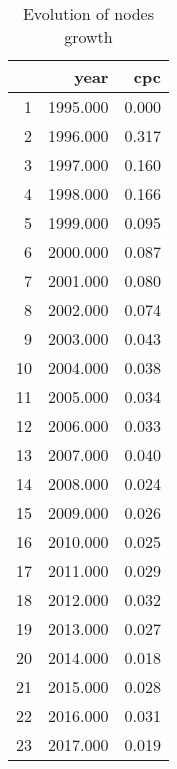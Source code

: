 \begin{table}[ht]
\centering
\begin{tabular}{rrr}
  \hline
 & year & cpc \\ 
  \hline
1 & 1995.000 & 0.000 \\ 
  2 & 1996.000 & 0.317 \\ 
  3 & 1997.000 & 0.160 \\ 
  4 & 1998.000 & 0.166 \\ 
  5 & 1999.000 & 0.095 \\ 
  6 & 2000.000 & 0.087 \\ 
  7 & 2001.000 & 0.080 \\ 
  8 & 2002.000 & 0.074 \\ 
  9 & 2003.000 & 0.043 \\ 
  10 & 2004.000 & 0.038 \\ 
  11 & 2005.000 & 0.034 \\ 
  12 & 2006.000 & 0.033 \\ 
  13 & 2007.000 & 0.040 \\ 
  14 & 2008.000 & 0.024 \\ 
  15 & 2009.000 & 0.026 \\ 
  16 & 2010.000 & 0.025 \\ 
  17 & 2011.000 & 0.029 \\ 
  18 & 2012.000 & 0.032 \\ 
  19 & 2013.000 & 0.027 \\ 
  20 & 2014.000 & 0.018 \\ 
  21 & 2015.000 & 0.028 \\ 
  22 & 2016.000 & 0.031 \\ 
  23 & 2017.000 & 0.019 \\ 
   \hline
\end{tabular}
\caption{Evolution of nodes growth} 
\end{table}
